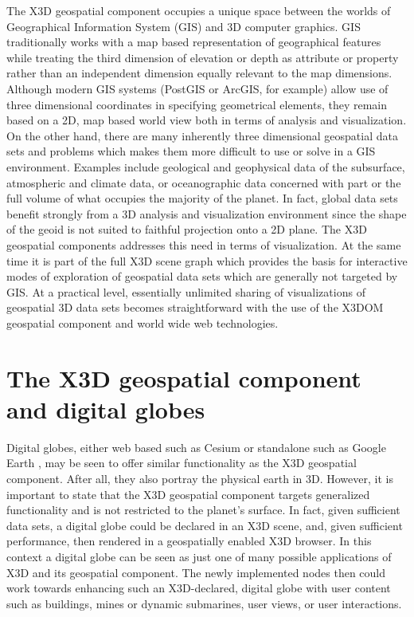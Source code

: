 \documentclass{acmsiggraph}                     %
\begin{document}
The X3D geospatial component occupies a unique space between the worlds of Geographical Information System (GIS) and 3D computer graphics. GIS traditionally works with a map based representation of geographical features while treating the third dimension of elevation or depth as attribute or property rather than an independent dimension equally relevant to the map dimensions. Although modern GIS systems (PostGIS or ArcGIS, for example) allow use of three dimensional coordinates in specifying geometrical elements, they remain based on a 2D, map based world view both in terms of analysis and visualization. On the other hand, there are many inherently three dimensional geospatial data sets and problems which makes them more difficult to use or solve in a GIS environment.  Examples include geological and geophysical data of the subsurface, atmospheric and climate data, or oceanographic data concerned with part or the full volume of what occupies the majority of the planet. In fact, global data sets benefit strongly from a 3D analysis and visualization environment since the shape of the geoid is not suited to faithful projection onto a 2D plane. The X3D geospatial components addresses this need in terms of visualization. At the same time it is part of the full X3D scene graph which provides the basis for interactive modes of exploration of geospatial data sets which are generally not targeted by GIS. At a practical level, essentially unlimited sharing of visualizations of geospatial 3D data sets becomes straightforward with the use of the X3DOM geospatial component and world wide web technologies.


\section{The X3D geospatial component and digital globes}

Digital globes, either web based such as Cesium \cite{cesium15} or standalone such as Google Earth \cite{googleearth15}, may be seen to offer similar functionality as the X3D geospatial component. After all, they also portray the physical earth in 3D. However, it is important to state that the X3D geospatial component targets generalized functionality and is not restricted to the planet's surface. In fact, given sufficient data sets, a digital globe could be declared in an X3D scene, and, given sufficient performance, then rendered in a geospatially enabled X3D browser. In this context a digital globe can be seen as just one of many possible applications of X3D and its geospatial component. The newly implemented nodes then could work towards enhancing such an X3D-declared, digital globe with user content such as buildings, mines or dynamic submarines, user views, or user interactions.
\end{document}

